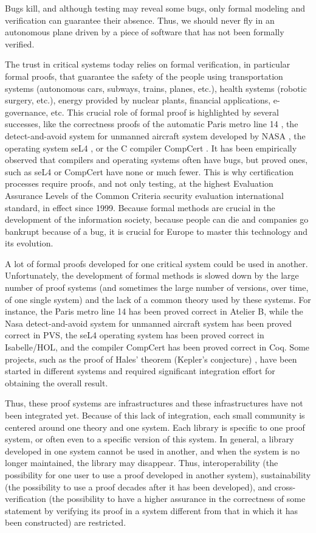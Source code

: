 \thispagestyle{empty}

Bugs kill, and although testing may reveal some bugs, only formal
modeling and verification can guarantee their absence.  Thus, we
should never fly in an autonomous plane driven by a piece of software
that has not been formally verified.

The trust in critical systems today relies on formal verification, in
particular formal proofs, that guarantee the
safety of the people using transportation systems (autonomous cars,
subways, trains, planes, etc.), health systems (robotic surgery,
etc.), energy provided by nuclear plants, financial applications,
e-governance, etc. This crucial role of formal proof is highlighted by
several successes, like the correctness proofs of the automatic Paris
metro line 14 \cite{metro14}, the detect-and-avoid system for unmanned
aircraft system developed by NASA \cite{Munoz16}, the operating system
seL4 \cite{Klein09}, or the C compiler CompCert \cite{Leroy06}.  It
has been empirically observed that compilers and operating systems
often have bugs, but proved ones, such as seL4 or CompCert have none
or much fewer.  This is why certification processes require proofs,
and not only testing, at the highest Evaluation Assurance Levels of
the Common Criteria security evaluation international standard, in
effect since 1999.  Because formal methods are crucial in the
development of the information society, because people can die and
companies go bankrupt because of a bug, it is crucial for Europe to
master this technology and its evolution.

A lot of formal proofs developed for one critical system could be used
in another.  Unfortunately, the development of formal methods is
slowed down by the large number of proof systems (and sometimes the
large number of versions, over time, of one single system) and the
lack of a common theory used by these systems.  For instance, the
Paris metro line 14 has been proved correct in Atelier B, while the
Nasa detect-and-avoid system for unmanned aircraft system has been
proved correct in PVS, the seL4 operating system has been proved
correct in Isabelle/HOL, and the compiler CompCert has been proved
correct in Coq.  Some projects, such as the proof of Hales' theorem
(Kepler's conjecture) \cite{Hales17}, have been started in different
systems and required significant integration effort for obtaining the
overall result.

Thus, these proof systems are infrastructures and these
infrastructures have not been integrated yet.  Because of this lack of
integration, each small community is centered around one theory and
one system. Each library is specific to one proof system, or often
even to a specific version of this system. In general, a library
developed in one system cannot be used in another, and when the system
is no longer maintained, the library may disappear.  Thus,
interoperability (the possibility for one user to use a proof
developed in another system), sustainability (the possibility to use a
proof decades after it has been developed), and cross-verification
(the possibility to have a higher assurance in the correctness of some
statement by verifying its proof in a system different from that in
which it has been constructed) are restricted.

